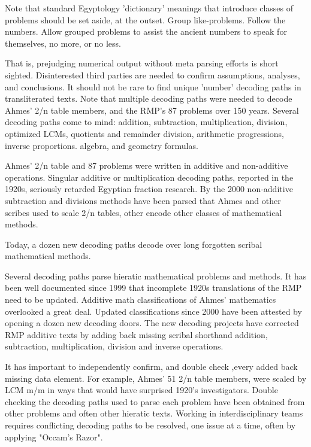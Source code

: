 \documentclass[12pt]{article}
\begin{document}
Note that standard Egyptology 'dictionary' meanings that introduce classes of problems should be set aside, at the outset. Group like-problems. Follow the numbers. Allow grouped problems to assist the ancient numbers to speak for themselves, no more, or no less.

That is, prejudging numerical output without meta parsing efforts is short sighted. Disinterested third parties are needed to confirm assumptions, analyses, and conclusions. It should not be rare to find unique 'number' decoding paths in transliterated texts. Note that multiple decoding paths were needed to decode Ahmes' 2/n table members, and the RMP's 87 problems over 150 years. Several decoding paths come to mind: addition, subtraction, multiplication, division, optimized LCMs, quotients and remainder division, arithmetic progressions, inverse proportions. algebra, and geometry formulas. 

Ahmes' 2/n table and 87 problems were written in additive and non-additive operations. Singular additive or multiplication decoding paths, reported in the 1920s, seriously retarded Egyptian fraction research. By the 2000 non-additive subtraction and divisions methods have been parsed that Ahmes and other scribes used to scale 2/n tables, other encode other classes of mathematical methods. 

Today,  a dozen new decoding paths decode over long forgotten scribal mathematical methods.

Several decoding paths parse hieratic mathematical problems and methods. It has been well documented since 1999 that incomplete 1920s translations of the RMP need to be updated. Additive math classifications of Ahmes' mathematics overlooked a great deal. Updated classifications since 2000 have been attested by opening a dozen new decoding doors. The new decoding projects have corrected RMP additive texts by adding back missing scribal shorthand addition, subtraction, multiplication, division and inverse operations. 

It has important to independently confirm, and double check ,every added back missing data element. For example, Ahmes' 51  2/n table members, were scaled by LCM m/m in ways that would have surprised 1920's investigators. Double checking the decoding paths used to parse each problem have been obtained from other problems and often other hieratic texts. Working in interdisciplinary teams requires conflicting decoding paths to be resolved, one issue at a time, often by applying "Occam's Razor". 
\end{document}
